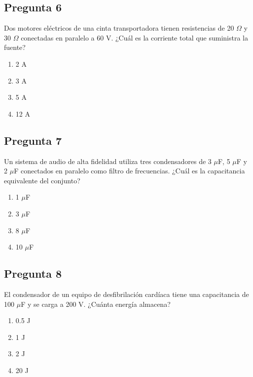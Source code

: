 
\begin{preguntabox}
\subsection{Pregunta 6}
Dos motores eléctricos de una cinta transportadora tienen resistencias de 20 $\Omega$ y 30 $\Omega$ conectadas en paralelo a 60 V. ¿Cuál es la corriente total que suministra la fuente?

\begin{enumerate}
    \item[A)] 2 A
    \item[B)] 3 A
    \item[C)] 5 A
    \item[D)] 12 A
\end{enumerate}
\end{preguntabox}

\begin{preguntabox}
\subsection{Pregunta 7}
Un sistema de audio de alta fidelidad utiliza tres condensadores de 3 $\mu$F, 5 $\mu$F y 2 $\mu$F conectados en paralelo como filtro de frecuencias. ¿Cuál es la capacitancia equivalente del conjunto?

\begin{enumerate}
    \item[A)] 1 $\mu$F
    \item[B)] 3 $\mu$F
    \item[C)] 8 $\mu$F
    \item[D)] 10 $\mu$F
\end{enumerate}
\end{preguntabox}

\begin{preguntabox}
\subsection{Pregunta 8}
El condensador de un equipo de desfibrilación cardíaca tiene una capacitancia de 100 $\mu$F y se carga a 200 V. ¿Cuánta energía almacena?

\begin{enumerate}
    \item[A)] 0.5 J
    \item[B)] 1 J
    \item[C)] 2 J
    \item[D)] 20 J
\end{enumerate}
\end{preguntabox}

